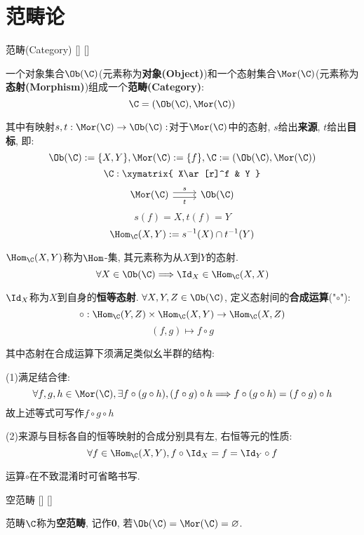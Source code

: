 \documentclass[UTF8]{ctexart}
\begin{document}
\section{范畴论}

    \begin{dfn}
        []
        {范畴(Category)}
        []
        []
        
        一个对象集合$\Ob(\C)$(元素称为\textbf{对象(Object)})和一个态射集合$\Mor(\C)$(元素称为\textbf{态射(Morphism)})组成一个\textbf{范畴(Category)}: 
        \[\C=(\Ob(\C),\Mor(\C))\]

        其中有映射$s,t:\Mor(\C)\to\Ob(\C): $对于$\Mor(\C)$中的态射, $s$给出\textbf{来源}, $t$给出\textbf{目标}, 即: 
        \[\Ob(\C):=\{X,Y\}, \Mor(\C):=\{f\}, \C:=(\Ob(\C),\Mor(\C))\]
        \[\C: \xymatrix{
            X\ar[r]^f & Y
        }\]
        \[\begin{tikzcd}
            \Mor(\C) \arrow[r, "s", shift left] \arrow[r, "t"', shift right] & \Ob(\C)
        \end{tikzcd}\]
        \[s(f)=X, t(f)=Y\]
        \[\Hom_{\C}(X,Y):=s^{-1}(X)\cap t^{-1}(Y)\]
        
        $\Hom_{\C}(X,Y)$称为$\Hom$-集, 其元素称为从$X$到$Y$的态射. 
        \[\forall X\in \Ob(\C)\Longrightarrow\Id_X\in\Hom_{\C}(X,X)\]
        
        $\Id_X$称为$X$到自身的\textbf{恒等态射}. 
        $\forall X,Y,Z\in\Ob(\C)$, 定义态射间的\textbf{合成运算}("$\circ$"): 
        \[\circ: \Hom_{\C}(Y,Z)\times\Hom_{\C}(X,Y)\to\Hom_{\C}(X,Z)\]
        \[(f,g)\mapsto f\circ g\]
        
        其中态射在合成运算下须满足类似幺半群的结构: 
        
        (1)满足结合律: \[\forall f,g,h\in\Mor(\C), \exists f\circ(g\circ h), (f\circ g)\circ h\Longrightarrow f\circ(g\circ h)=(f\circ g)\circ h\]
        故上述等式可写作$f\circ g\circ h$

        (2)来源与目标各自的恒等映射的合成分别具有左, 右恒等元的性质: 
        \[\forall f\in\Hom_{\C}(X,Y), f\circ\Id_X=f=\Id_Y\circ f\]

        运算$\circ$在不致混淆时可省略书写. 
    \end{dfn}

    \begin{dfn}
        []
        {空范畴}
        []
        []


        范畴$\C$称为\textbf{空范畴}, 记作$\mathbf{0}$, 若$\Ob(\C)=\Mor(\C)=\varnothing$. 
    \end{dfn}
    
\end{document}

